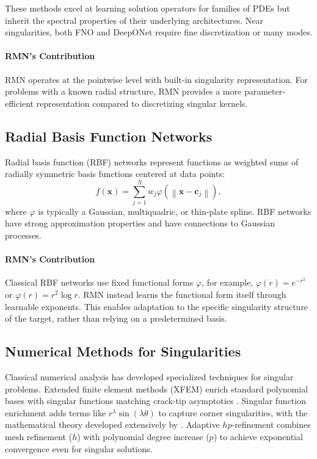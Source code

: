 \documentclass[twoside,11pt]{article}
\newcommand{\bx}{\bm{x}}
\newcommand{\bc}{\bm{c}}
\newcommand{\norm}[1]{\left\|#1\right\|}
\begin{document}
These methods excel at learning solution operators for families of PDEs but inherit the spectral properties of their underlying architectures. Near singularities, both FNO and DeepONet require fine discretization or many modes.

\paragraph{RMN's Contribution} RMN operates at the pointwise level with built-in singularity representation. For problems with a known radial structure, RMN provides a more parameter-efficient representation compared to discretizing singular kernels.

\subsection{Radial Basis Function Networks}

Radial basis function (RBF) networks \citep{powell1987radial, broomhead1988radial, park1991universal} represent functions as weighted sums of radially symmetric basis functions centered at data points:
\begin{equation}
	f(\bx) = \sum_{j=1}^N w_j \varphi(\norm{\bx - \bc_j}),
\end{equation}
where $\varphi$ is typically a Gaussian, multiquadric, or thin-plate spline. RBF networks have strong approximation properties \citep{wendland2004scattered} and have connections to Gaussian processes.

\paragraph{RMN's Contribution} Classical RBF networks use fixed functional forms $\varphi$, for example, $\varphi(r) = e^{-r^2}$ or $\varphi(r) = r^2 \log r$. RMN instead learns the functional form itself through learnable exponents. This enables adaptation to the specific singularity structure of the target, rather than relying on a predetermined basis.

\subsection{Numerical Methods for Singularities}

Classical numerical analysis has developed specialized techniques for singular problems. Extended finite element methods (XFEM) \citep{moes1999finite, belytschko1999elastic} enrich standard polynomial bases with singular functions matching crack-tip asymptotics \citep{williams1957stress}. Singular function enrichment \citep{fix1973singular} adds terms like $r^{\lambda} \sin(\lambda\theta)$ to capture corner singularities, with the mathematical theory developed extensively by \citet{grisvard2011elliptic}. Adaptive $hp$-refinement \citep{babuska1986hp, schwab1998p} combines mesh refinement ($h$) with polynomial degree increase ($p$) to achieve exponential convergence even for singular solutions.
\end{document}
